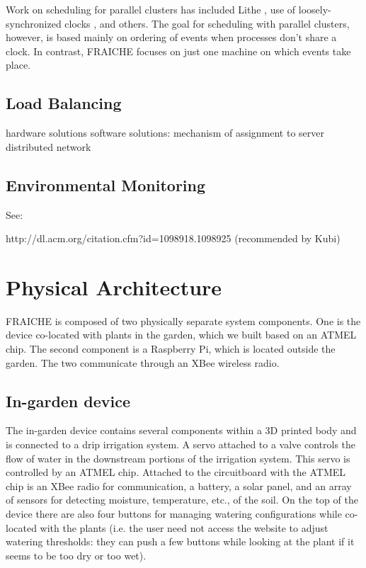 \documentclass[a4paper]{acm_proc_article-sp}
\makeatletter
\newcommand{\ie}{i.e.\@\xspace}
\newcommand{\etc}{etc.\@\xspace}
\makeatother
\begin{document}
Work on scheduling for parallel clusters has included Lithe \cite{}, use of loosely-synchronized clocks \cite{}, and others.  The goal for scheduling with parallel clusters, however, is based mainly on ordering of events when processes don't share a clock.  In contrast, FRAICHE focuses on just one machine on which events take place.

\subsection{Load Balancing}

hardware solutions
software solutions: mechanism of assignment to server
distributed network


\subsection{Environmental Monitoring}
See:

http://dl.acm.org/citation.cfm?id=1098918.1098925
(recommended by Kubi)



\section{Physical Architecture}

FRAICHE is composed of two physically separate system components.  One is the device co-located with plants in the garden, which we built based on an ATMEL chip.  The second component is a Raspberry Pi, which is located outside the garden.  The two communicate through an XBee wireless radio.

\subsection{In-garden device}

The in-garden device contains several components within a 3D printed body and is connected to a drip irrigation system.  A servo attached to a valve controls the flow of water in the downstream portions of the irrigation system.  This servo is controlled by an ATMEL chip.  Attached to the circuitboard with the ATMEL chip is an XBee radio for communication, a battery, a solar panel, and an array of sensors for detecting moisture, temperature, \etc, of the soil.  On the top of the device there are also four buttons for managing watering configurations while co-located with the plants (\ie the user need not access the website to adjust watering thresholds: they can push a few buttons while looking at the plant if it seems to be too dry or too wet).
\end{document}

